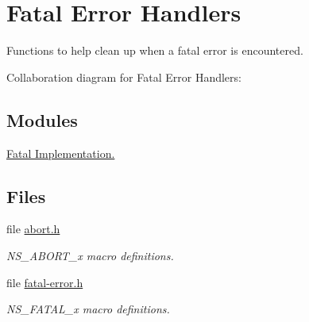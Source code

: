 \hypertarget{group__fatal}{}\section{Fatal Error Handlers}
\label{group__fatal}


Functions to help clean up when a fatal error is encountered.  


Collaboration diagram for Fatal Error Handlers\+:
\subsection*{Modules}
\begin{DoxyCompactItemize}
\item 
\hyperlink{group__fatalimpl}{Fatal Implementation.}
\end{DoxyCompactItemize}
\subsection*{Files}
\begin{DoxyCompactItemize}
\item 
file \hyperlink{abort_8h}{abort.\+h}
\begin{DoxyCompactList}\small\item\em {\ttfamily N\+S\+\_\+\+A\+B\+O\+R\+T\+\_\+x} macro definitions. \end{DoxyCompactList}\item 
file \hyperlink{fatal-error_8h}{fatal-\/error.\+h}
\begin{DoxyCompactList}\small\item\em {\ttfamily N\+S\+\_\+\+F\+A\+T\+A\+L\+\_\+x} macro definitions. \end{DoxyCompactList}\end{DoxyCompactItemize}
